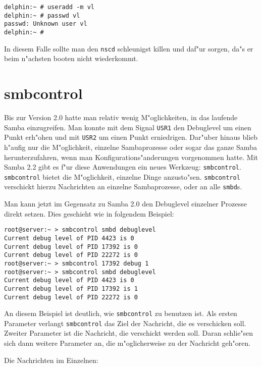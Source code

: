 \documentclass{scrartcl}\usepackage{pslatex}\typearea{12}
\newcommand{\prog}{\texttt}
\begin{document}
\begin{verbatim}
delphin:~ # useradd -m vl
delphin:~ # passwd vl
passwd: Unknown user vl
delphin:~ #
\end{verbatim}

In diesem Falle sollte man den \prog{nscd} schleunigst killen und
daf"ur sorgen, da"s er beim n"achsten booten nicht wiederkommt.


\section{smbcontrol}

Bis zur Version 2.0 hatte man relativ wenig M"oglichkeiten, in das
laufende Samba einzugreifen. Man konnte mit dem Signal \texttt{USR1}
den Debuglevel um einen Punkt erh"ohen und mit \texttt{USR2} um einen
Punkt erniedrigen. Dar"uber hinaus blieb h"aufig nur die M"oglichkeit,
einzelne Sambaprozesse oder sogar das ganze Samba herunterzufahren,
wenn man Konfigurations"anderungen vorgenommen hatte. Mit Samba 2.2
gibt es f"ur diese Anwendungen ein neues Werkzeug: \prog{smbcontrol}.
\prog{smbcontrol} bietet die M"oglichkeit, einzelne Dinge anzusto"sen.
\prog{smbcontrol} verschickt hierzu Nachrichten an einzelne
Sambaprozesse, oder an alle \prog{smbd}s.

Man kann jetzt im Gegensatz zu Samba 2.0 den Debuglevel einzelner
Prozesse direkt setzen. Dies geschieht wie in folgendem Beispiel:

\begin{verbatim}
root@server:~ > smbcontrol smbd debuglevel
Current debug level of PID 4423 is 0 
Current debug level of PID 17392 is 0 
Current debug level of PID 22272 is 0 
root@server:~ > smbcontrol 17392 debug 1  
root@server:~ > smbcontrol smbd debuglevel
Current debug level of PID 4423 is 0 
Current debug level of PID 17392 is 1 
Current debug level of PID 22272 is 0 
\end{verbatim}

An diesem Beispiel ist deutlich, wie \prog{smbcontrol} zu benutzen
ist. Als ersten Parameter verlangt \prog{smbcontrol} das Ziel der
Nachricht, die es verschicken soll. Zweiter Parameter ist die
Nachricht, die verschickt werden soll. Daran schlie"sen sich dann
weitere Parameter an, die m"oglicherweise zu der Nachricht geh"oren.

Die Nachrichten im Einzelnen:
\end{document}

